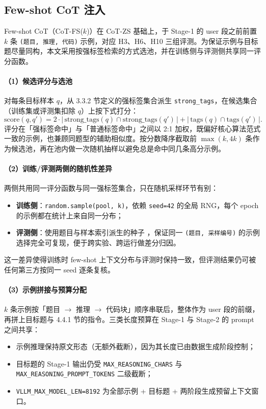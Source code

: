 \subsection{Few-shot CoT 注入}

Few-shot CoT（CoT-FS($k$)）在 CoT-ZS 基础上，于 Stage-1 的 user 段之前前置 $k$ 条 \texttt{(题目, 推理, 代码)} 示例，对应 H3、H6、H10 三组评测。为保证示例与目标题尽量同构，本文采用按强标签检索的方式选池，并在训练侧与评测侧共享同一评分函数。

\paragraph{（1）候选评分与选池}
对每条目标样本 $q$，从 3.3.2 节定义的强标签集合派生 \texttt{strong\_tags}，在候选集合（训练集或评测集扣除 $q$）上按下式打分：
\[
\mathrm{score}(q, q') = 2 \cdot \bigl|\,\mathrm{strong\_tags}(q) \cap \mathrm{strong\_tags}(q')\,\bigr|
                       + \bigl|\,\mathrm{tags}(q) \cap \mathrm{tags}(q')\,\bigr|.
\]
评分在「强标签命中」与「普通标签命中」之间以 2:1 加权，既偏好核心算法范式一致的示例，也兼顾同题型的辅助相似度。按分数降序截取前 $\max(k, 4k)$ 条作为候选池，再在池内做一次随机抽样以避免总是命中同几条高分示例。

\paragraph{（2）训练/评测两侧的随机性差异}
两侧共用同一评分函数与同一强标签集合，只在随机采样环节有别：
\begin{itemize}
    \item \textbf{训练侧}：\texttt{random.sample(pool, k)}，依赖 \texttt{seed=42} 的全局 RNG，每个 epoch 的示例都在统计上来自同一分布；
    \item \textbf{评测侧}：使用题目与样本索引派生的种子 ，保证同一 \texttt{(题目, 采样编号)} 的示例选择完全可复现，便于跨实验、跨运行做差分归因。
\end{itemize}
这一差异使得训练时 few-shot 上下文分布与评测时保持一致，但评测结果仍可被任何第三方按同一 seed 逐条复核。

\paragraph{（3）示例拼接与预算分配}
$k$ 条示例按「题目 $\to$ 推理 $\to$ 代码块」顺序串联后，整体作为 user 段的前缀，再拼上目标题与 4.4.1 节的指令。三类长度预算在 Stage-1 与 Stage-2 的 prompt 之间共享：
\begin{itemize}
    \item 示例推理保持原文形态（无额外截断），因为其长度已由数据生成阶段控制；
    \item 目标题的 Stage-1 输出仍受 \texttt{MAX\_REASONING\_CHARS} 与 \texttt{MAX\_REASONING\_PROMPT\_TOKENS} 二级截断；
    \item \texttt{VLLM\_MAX\_MODEL\_LEN=8192} 为全部示例 + 目标题 + 两阶段生成预留上下文窗口。
\end{itemize}

